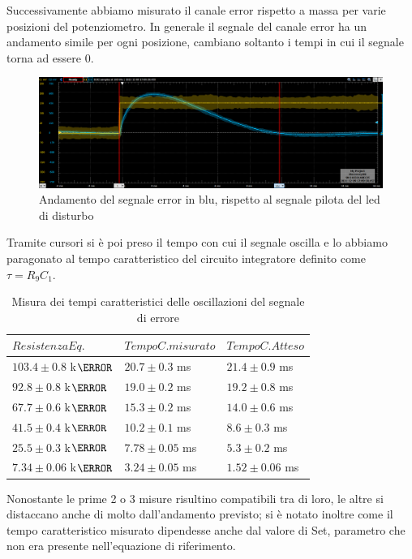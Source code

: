 \documentclass[10pt, a4paper, italian]{article}
\begin{document}
Successivamente abbiamo misurato il canale error rispetto a massa per varie posizioni del potenziometro. In generale il segnale del canale error ha un andamento simile per ogni posizione, cambiano soltanto i tempi in cui il segnale torna ad essere 0.
\begin{figure}[H]
    \centering
	\includegraphics[scale=0.7]{7}
    \caption{Andamento del segnale error in blu, rispetto al segnale pilota del led di disturbo
    \label{fig: Draft1}}
\end{figure}
Tramite cursori si è poi preso il tempo con cui il segnale oscilla e lo abbiamo paragonato al tempo caratteristico del circuito integratore definito come $\tau = R_9C_1$.
\begin{table}[H]
\centering
\begin{tabular}{@{}lll@{}}
\toprule
$Resistenza Eq.$ & $Tempo C. misurato$ & $Tempo C. Atteso$\\
\midrule
$103.4 \pm 0.8 $ k$\ohm$ & $20.7 \pm 0.3$ ms  	& $ 21.4 \pm 0.9$ ms	\\
$92.8 \pm 0.8$ k$\ohm$ & $19.0 \pm 0.2$ ms 	& $ 19.2 \pm 0.8 $ ms	\\
$67.7 \pm 0.6$ k$\ohm$ & $15.3 \pm 0.2$ ms 	& $ 14.0 \pm 0.6 $ ms\\
$41.5 \pm 0.4$ k$\ohm$ & $10.2 \pm 0.1$ 	ms & $ 8.6 \pm 0.3 $ ms\\
$25.5 \pm 0.3$ k$\ohm$ & $7.78 \pm 0.05$ 	ms & $ 5.3 \pm 0.2 $ ms\\
$7.34 \pm0.06$ k$\ohm$ & $3.24 \pm 0.05$ 	ms & $ 1.52 \pm 0.06$ ms\\

\bottomrule
\end{tabular}
\caption{Misura dei tempi caratteristici delle oscillazioni del segnale di errore}
\end{table}
Nonostante le prime  2 o 3 misure risultino compatibili tra di loro, le altre si distaccano anche di molto dall'andamento previsto; si è notato inoltre come il tempo caratteristico misurato dipendesse anche dal valore di Set, parametro che non era presente nell'equazione di riferimento.
\end{document}
